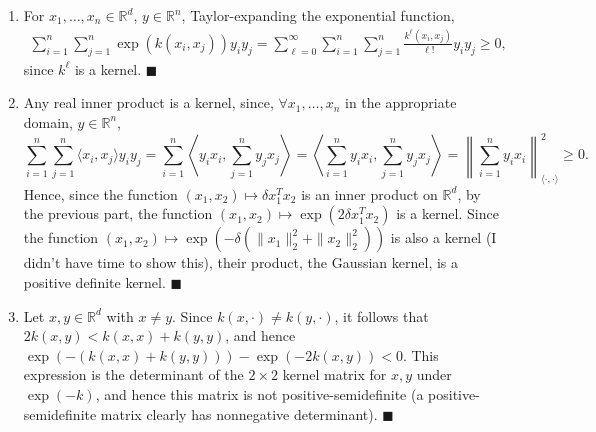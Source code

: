 \documentclass[11pt]{article}
\renewcommand{\qed}{\quad \ensuremath{\blacksquare}}
\newcommand{\R}{\mathbb{R}} %
\begin{document}
\begin{enumerate}
\item For $x_1,\dots,x_n \in \R^d$, $y \in \R^n$, Taylor-expanding the
exponential function,
\begin{align*}
\sum_{i = 1}^n \sum_{j = 1}^n \exp(k(x_i,x_j)) y_iy_j
    = \sum_{\ell = 0}^\infty \sum_{i = 1}^n \sum_{j = 1}^n
            \frac{k^\ell(x_i,x_j)}{\ell!} y_iy_j
    \geq 0,
\end{align*}
since $k^\ell$ is a kernel. \qed
\item Any real inner product is a kernel, since,
$\forall x_1,\dots,x_n$ in the appropriate domain, $y \in \R^n$,
\[\sum_{i = 1}^n \sum_{j = 1}^n \langle x_i, x_j \rangle y_i y_j
    = \sum_{i = 1}^n \left\langle y_i x_i, \sum_{j = 1}^n y_j x_j \right\rangle
    = \left\langle \sum_{i = 1}^n y_i x_i, \sum_{j = 1}^n y_j x_j \right\rangle
    = \left\| \sum_{i = 1}^n y_i x_i \right\|_{\langle \cdot, \cdot \rangle}^2
    \geq 0.
\]
Hence, since the function $(x_1,x_2) \mapsto \delta x_1^Tx_2$ is an inner
product on $\R^d$, by the previous part, the function
$(x_1,x_2) \mapsto \exp(2\delta x_1^Tx_2)$ is a kernel. Since the function
$(x_1,x_2) \mapsto \exp(-\delta(\|x_1\|_2^2 + \|x_2\|_2^2))$ is also a kernel
(I didn't have time to show this), their product, the Gaussian kernel, is a
positive definite kernel. \qed

\item Let $x,y \in \R^d$ with $x \neq y$. Since $k(x,\cdot) \neq k(y,\cdot)$,
it follows that $2k(x,y) < k(x,x) + k(y,y)$, and hence
$\exp(-(k(x,x) + k(y,y))) - \exp(-2k(x,y)) < 0$. This expression is the
determinant of the $2 \times 2$ kernel matrix for $x,y$ under $\exp(-k)$, and
hence this matrix is not positive-semidefinite (a positive-semidefinite matrix
clearly has nonnegative determinant). \qed
\end{enumerate}
\end{document}
